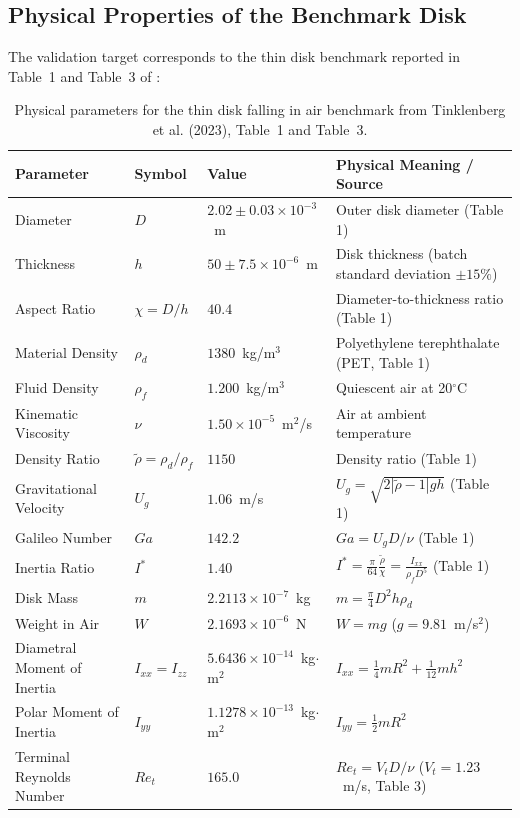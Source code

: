 \documentclass[11pt,a4paper]{article}
\begin{document}
\subsection{Physical Properties of the Benchmark Disk}
The validation target corresponds to the thin disk benchmark reported in Table~1 and Table~3 of \cite{tinklenberg2023}:
\begin{table}[H]
\centering
\small
\begin{tabularx}{\textwidth}{l l l X}
\toprule
\textbf{Parameter} & \textbf{Symbol} & \textbf{Value} & \textbf{Physical Meaning / Source} \\
\midrule
Diameter & $D$ & $2.02 \pm 0.03 \times 10^{-3}$~m & Outer disk diameter (Table 1) \\
Thickness & $h$ & $50 \pm 7.5 \times 10^{-6}$~m & Disk thickness (batch standard deviation $\pm 15\%$) \\
Aspect Ratio & $\chi = D/h$ & $40.4$ & Diameter-to-thickness ratio (Table 1) \\
Material Density & $\rho_d$ & $1380$~kg/m$^3$ & Polyethylene terephthalate (PET, Table 1) \\
Fluid Density & $\rho_f$ & $1.200$~kg/m$^3$ & Quiescent air at 20$^\circ$C \\
Kinematic Viscosity & $\nu$ & $1.50 \times 10^{-5}$~m$^2$/s & Air at ambient temperature \\
Density Ratio & $\tilde{\rho} = \rho_d/\rho_f$ & $1150$ & Density ratio (Table 1) \\
Gravitational Velocity & $U_g$ & $1.06$~m/s & $U_g = \sqrt{2|\tilde{\rho}-1|gh}$ (Table 1) \\
Galileo Number & $Ga$ & $142.2$ & $Ga = U_g D / \nu$ (Table 1) \\
Inertia Ratio & $I^*$ & $1.40$ & $I^* = \frac{\pi}{64} \frac{\tilde{\rho}}{\chi} = \frac{I_{xx}}{\rho_f D^5}$ (Table 1) \\
Disk Mass & $m$ & $2.2113 \times 10^{-7}$~kg & $m = \frac{\pi}{4} D^2 h \rho_d$ \\
Weight in Air & $W$ & $2.1693 \times 10^{-6}$~N & $W = m g$ ($g = 9.81$~m/s$^2$) \\
Diametral Moment of Inertia & $I_{xx} = I_{zz}$ & $5.6436 \times 10^{-14}$~kg$\cdot$m$^2$ & $I_{xx} = \frac{1}{4} m R^2 + \frac{1}{12} m h^2$ \\
Polar Moment of Inertia & $I_{yy}$ & $1.1278 \times 10^{-13}$~kg$\cdot$m$^2$ & $I_{yy} = \frac{1}{2} m R^2$ \\
Terminal Reynolds Number & $Re_t$ & $165.0$ & $Re_t = V_t D / \nu$ ($V_t = 1.23$~m/s, Table 3) \\
\bottomrule
\end{tabularx}
\caption{Physical parameters for the thin disk falling in air benchmark from Tinklenberg et al. (2023), Table~1 and Table~3.}
\label{tab:physical_props}
\end{table}
\end{document}
